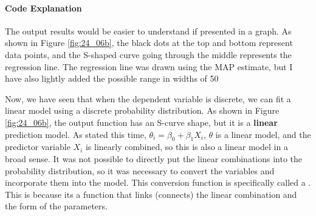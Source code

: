 \documentclass{ltjsbook}
\begin{document}

\paragraph{Code Explanation}



The output results would be easier to understand if presented in a graph. As shown in Figure \ref{fig:24_06b}, the black dots at the top and bottom represent data points, and the S-shaped curve going through the middle represents the regression line.
The regression line was drawn using the MAP estimate, but I have also lightly added the possible range in widths of 50%


Now, we have seen that when the dependent variable is discrete, we can fit a linear model using a discrete probability distribution.
As shown in Figure \ref{fig:24_06b}, the output function has an S-curve shape, but it is a \textbf{linear} prediction model. As stated this time, $\theta_i = \beta_0 + \beta_1 X_i$, $\theta$ is a linear model, and the predictor variable $X_i$ is linearly combined, so this is also a linear model in a broad sense.
It was not possible to directly put the linear combinations into the probability distribution, so it was necessary to convert the variables and incorporate them into the model. This conversion function is specifically called a . This is because its a function that links (connects) the linear combination and the form of the parameters.
\end{document}
